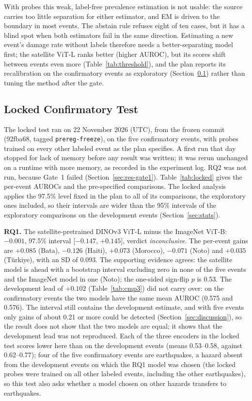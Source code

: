 \documentclass[journal]{IEEEtran}
\begin{document}
With probes this weak, label-free prevalence estimation is not usable: the source carries too little separation for either estimator, and EM is driven to the boundary in most events. The abstain rule refuses eight of ten cases, but it has a blind spot when both estimators fail in the same direction. Estimating a new event's damage rate without labels therefore needs a better-separating model first; the satellite ViT-L ranks better (higher AUROC), but its scores shift between events even more (Table~\ref{tab:threshold}), and the plan reports its recalibration on the confirmatory events as exploratory (Section~\ref{sec:res-locked}) rather than tuning the method after the gate.

\subsection{Locked Confirmatory Test}
\label{sec:res-locked}
The locked test ran on 22 November 2026 (UTC), from the frozen commit (92fba68, tagged \texttt{prereg-freeze}), on the five confirmatory events, with probes trained on every other labeled event as the plan specifies. A first run that day stopped for lack of memory before any result was written; it was rerun unchanged on a runtime with more memory, as recorded in the experiment log. RQ2 was not run, because Gate~1 failed (Section~\ref{sec:res-gate1}). Table~\ref{tab:locked} gives the per-event AUROCs and the pre-specified comparisons. The locked analysis applies the 97.5\% level fixed in the plan to all of its comparisons, the exploratory ones included, so their intervals are wider than the 95\% intervals of the exploratory comparisons on the development events (Section~\ref{sec:stats}).

\textbf{RQ1.} The satellite-pretrained DINOv3 ViT-L minus the ImageNet ViT-B: $-0.001$, 97.5\% interval [$-0.147$, $+0.145$], verdict \emph{inconclusive}. The per-event gains are $+0.085$ (Bata), $-0.126$ (Haiti), $+0.073$ (Morocco), $-0.071$ (Noto) and $+0.035$ (T\"urkiye), with an SD of 0.093. The supporting evidence agrees: the satellite model is ahead with a bootstrap interval excluding zero in none of the five events and the ImageNet model in one (Noto); the one-sided sign-flip $p$ is 0.53. The development lead of $+0.102$ (Table~\ref{tab:cmp3}) did not carry over: on the confirmatory events the two models have the same mean AUROC (0.575 and 0.576). The interval still contains the development estimate, and with five events only gains of about 0.21 or more could be detected (Section~\ref{sec:discussion}), so the result does not show that the two models are equal; it shows that the development lead was not reproduced. Each of the three encoders in the locked test scores lower here than on the development events (means 0.53--0.58, against 0.62--0.77); four of the five confirmatory events are earthquakes, a hazard absent from the development events on which the RQ1 model was chosen (the locked probes were trained on all other labeled events, including the other earthquakes), so this test also asks whether a model chosen on other hazards transfers to earthquakes.
\end{document}
